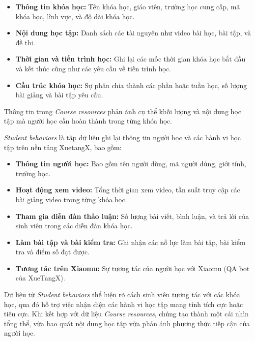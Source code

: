 \begin{itemize}
    \item \textbf{Thông tin khóa học:} Tên khóa học, giáo viên, trường học cung cấp, mã khóa học, lĩnh vực, và độ dài khóa học.
    \item \textbf{Nội dung học tập:} Danh sách các tài nguyên như video bài học, bài tập, và đề thi.
    \item \textbf{Thời gian và tiến trình học:} Ghi lại các mốc thời gian khóa học bắt đầu và kết thúc cũng như các yêu cầu về tiến trình học.
    \item \textbf{Cấu trúc khóa học:} Sự phân chia thành các phần hoặc tuần học, số lượng bài giảng và bài tập yêu cầu.
\end{itemize}
Thông tin trong \textit{Course resources} phản ánh cụ thể khối lượng và nội dung học tập mà người học cần hoàn thành trong từng khóa học. 

\textit{Student behaviors} là tập dữ liệu ghi lại thông tin người học và các hành vi học tập trên nền tảng XuetangX, bao gồm:
\begin{itemize}
    \item \textbf{Thông tin người học:} Bao gồm tên người dùng, mã người dùng, giới tính, trường học.
    \item \textbf{Hoạt động xem video:} Tổng thời gian xem video, tần suất truy cập các bài giảng video trong từng khóa học.
    \item \textbf{Tham gia diễn đàn thảo luận:} Số lượng bài viết, bình luận, và trả lời của sinh viên trong các diễn đàn khóa học.
    \item \textbf{Làm bài tập và bài kiểm tra:} Ghi nhận các nỗ lực làm bài tập, bài kiểm tra và điểm số đạt được.
    \item \textbf{Tương tác trên Xiaomu:} Sự tương tác của người học với Xiaomu (QA bot của XueTangX).
\end{itemize}
Dữ liệu từ \textit{Student behaviors} thể hiện rõ cách sinh viên tương tác với các khóa học, qua đó hỗ trợ việc nhận diện các hành vi học tập mang tính tích cực hoặc tiêu cực. Khi kết hợp với dữ liệu \textit{Course resources}, chúng tạo thành một cái nhìn tổng thể, vừa bao quát nội dung học tập vừa phản ánh phương thức tiếp cận của người học.



